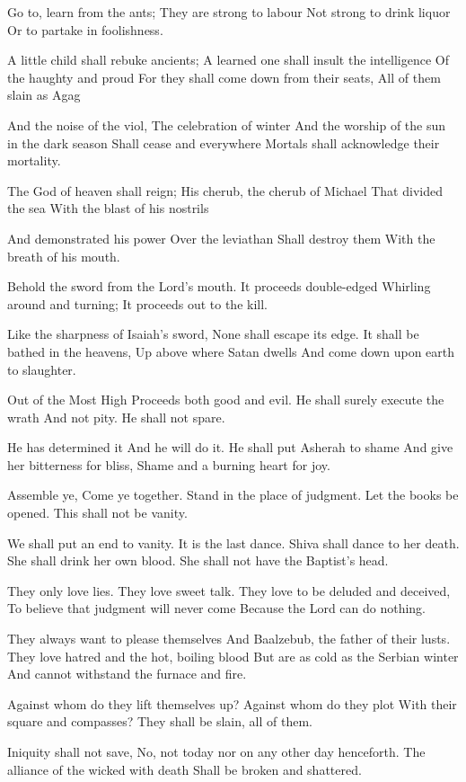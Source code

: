 \documentclass[
]{book}
\begin{document}
Go to, learn from the ants;
They are strong to labour
Not strong to drink liquor
Or to partake in foolishness.

A little child shall rebuke ancients;
A learned one shall insult the intelligence
Of the haughty and proud
For they shall come down from their seats,
All of them slain as Agag

And the noise of the viol,
The celebration of winter
And the worship of the sun in the dark season
Shall cease and everywhere
Mortals shall acknowledge their mortality.

The God of heaven shall reign;
His cherub, the cherub of Michael
That divided the sea
With the blast of his nostrils

And demonstrated his power
Over the leviathan
Shall destroy them
With the breath of his mouth.

Behold the sword from the Lord's mouth.
It proceeds double-edged
Whirling around and turning;
It proceeds out to the kill.

Like the sharpness of Isaiah's sword,
None shall escape its edge.
It shall be bathed in the heavens,
Up above where Satan dwells
And come down upon earth to slaughter.

Out of the Most High
Proceeds both good and evil.
He shall surely execute the wrath
And not pity.
He shall not spare.

He has determined it
And he will do it.
He shall put Asherah to shame
And give her bitterness for bliss,
Shame and a burning heart for joy.

Assemble ye,
Come ye together.
Stand in the place of judgment.
Let the books be opened.
This shall not be vanity.

We shall put an end to vanity.
It is the last dance.
Shiva shall dance to her death.
She shall drink her own blood.
She shall not have the Baptist's head.

They only love lies.
They love sweet talk.
They love to be deluded and deceived,
To believe that judgment will never come
Because the Lord can do nothing.

They always want to please themselves
And Baalzebub, the father of their lusts.
They love hatred and the hot, boiling blood
But are as cold as the Serbian winter
And cannot withstand the furnace and fire.

Against whom do they lift themselves up?
Against whom do they plot
With their square and compasses?
They shall be slain, all of them.

Iniquity shall not save,
No, not today nor on any other day henceforth.
The alliance of the wicked with death
Shall be broken and shattered.
\end{document}
